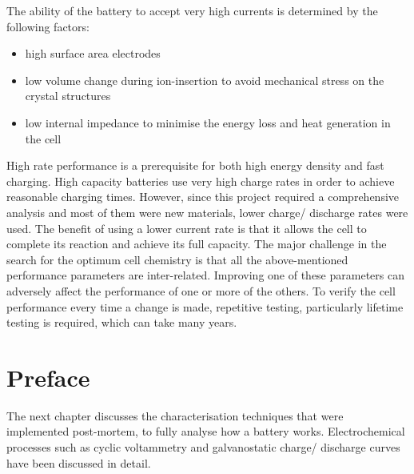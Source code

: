 The ability of the battery to accept very high currents is determined by the following factors:
\begin{itemize}
    \item high surface area electrodes
    \item low volume change during ion-insertion to avoid mechanical stress on the crystal structures
    \item low internal impedance to minimise the energy loss and heat generation in the cell
\end{itemize}

High rate performance is a prerequisite for both high energy density and fast charging. High capacity batteries use very high charge rates in order to achieve reasonable charging times. However, since this project required a comprehensive analysis and most of them were new materials, lower charge/ discharge rates were used. The benefit of using a lower current rate is that it allows the cell to complete its reaction and achieve its full capacity.  
The major challenge in the search for the optimum cell chemistry is that all the above-mentioned performance parameters are inter-related. Improving one of these parameters can adversely affect the performance of one or more of the others. To verify the cell performance every time a change is made, repetitive testing, particularly lifetime testing is required, which can take many years.
\newpage
\section*{\centering Preface}
The next chapter discusses the characterisation techniques that were implemented post-mortem, to fully analyse how a battery works. Electrochemical processes such as cyclic voltammetry and galvanostatic charge/ discharge curves have been discussed in detail. 





















